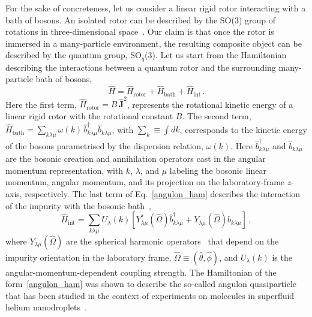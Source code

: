 \documentclass[aps,prl,reprint,showpacs,floatfix]{revtex4-1}
\def\be{\begin{equation}}
\def\ee{\end{equation}}
\renewcommand{\vec}{\vectorsym}
\renewcommand*{\vec}[1]{\boldsymbol{#1}}
\begin{document}
For the sake of concreteness, let us  consider a linear rigid rotor interacting with a bath of bosons. An isolated rotor can be described by the SO(3) group of rotations in three-dimensional space~\cite{Varshalovich}. Our claim is that once the rotor is immersed in a many-particle environment, the resulting composite object can be described by the quantum group, SO$_q$(3). Let us start from the Hamiltonian describing the interactions between a quantum rotor and the surrounding many-particle bath of bosons,
\be
\label{angulon_ham}
\hat H = \hat H_\text{rotor}  + \hat H_\text{bath} + \hat H_\text{int} \, .
\ee
Here the first term, $\hat H_\text{rotor} = B \, \vec{\hat{J}}^2$, represents the rotational kinetic energy of a linear rigid rotor with the rotational constant $B$. The second term, $\hat H_\text{bath} = \sum_{k \lambda \mu} \omega (k) \, \hat{b}^\dagger_{k \lambda \mu} \hat{b}_{k \lambda \mu}$, with $\sum_k \equiv \int d k$, corresponds to the kinetic energy of the bosons parametrised by the dispersion relation, $\omega(k)$. Here $\hat{b}^\dagger_{k \lambda \mu} $ and $\hat{b}_{k \lambda \mu}$ are the bosonic creation and annihilation operators cast in the angular momentum representation, with $k$, $\lambda$, and $\mu$ labeling the bosonic linear momentum, angular momentum, and its projection on the laboratory-frame $z$-axis, respectively. The last term of Eq.~\eqref{angulon_ham} describes the interaction of the impurity with the bosonic bath~\cite{Lemeshko_2015},
\be
\label{Hint}
\hat H_\text{int} =  \sum_{k \lambda \mu} U_{\lambda} (k) \left[ Y^{*}_{\lambda \mu}(\hat{\Omega}) \hat{b}^\dagger_{k \lambda \mu} + Y_{\lambda \mu}(\hat{\Omega}) \hat{b}_{k \lambda \mu}  \right] \, ,
\ee
where $Y_{\lambda \mu}(\hat{\Omega})$ are the spherical harmonic operators~\cite{Varshalovich} that depend on the impurity orientation in the laboratory frame, $\hat \Omega \equiv (\hat \theta, \hat \phi)$, and $U_{\lambda} (k)$ is the angular-momentum-dependent coupling strength. The Hamiltonian of the form~\eqref{angulon_ham} was shown to describe the so-called angulon quasiparticle that has been studied in the context of experiments on molecules in superfluid helium nanodroplets~\cite{PhysRevX.6.011012,lemeshko2016quasiparticle,Shepperson16,Cherepanov}.
\end{document}
